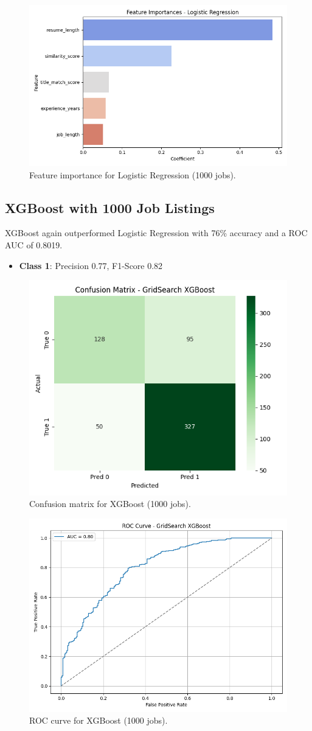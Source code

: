 \documentclass[a4paper]{article}
\begin{document}
\begin{multicols}{2}
\begin{figure}[H]
\centering
\includegraphics[width=0.75\linewidth]{Images/featimp_logreg_1000.png}
\caption{Feature importance for Logistic Regression (1000 jobs).}
\end{figure}

\subsection{XGBoost with 1000 Job Listings}
XGBoost again outperformed Logistic Regression with 76\% accuracy and a ROC AUC of 0.8019.

\begin{itemize}
    \item \textbf{Class 1}: Precision 0.77, F1-Score 0.82
\end{itemize}

\begin{figure}[H]
\centering
\includegraphics[width=0.55\linewidth]{Images/conf_matrix_xgb_1000.png}
\caption{Confusion matrix for XGBoost (1000 jobs).}
\end{figure}

\begin{figure}[H]
\centering
\includegraphics[width=0.65\linewidth]{Images/roc_xgb_1000.png}
\caption{ROC curve for XGBoost (1000 jobs).}
\end{figure}


\end{multicols}
\end{document}
